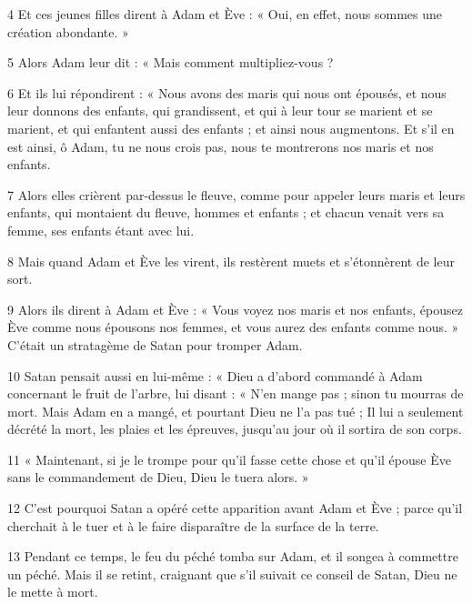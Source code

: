 \par 4 Et ces jeunes filles dirent à Adam et Ève : « Oui, en effet, nous sommes une création abondante. »

\par 5 Alors Adam leur dit : « Mais comment multipliez-vous ?

\par 6 Et ils lui répondirent : « Nous avons des maris qui nous ont épousés, et nous leur donnons des enfants, qui grandissent, et qui à leur tour se marient et se marient, et qui enfantent aussi des enfants ; et ainsi nous augmentons. Et s’il en est ainsi, ô Adam, tu ne nous crois pas, nous te montrerons nos maris et nos enfants.

\par 7 Alors elles crièrent par-dessus le fleuve, comme pour appeler leurs maris et leurs enfants, qui montaient du fleuve, hommes et enfants ; et chacun venait vers sa femme, ses enfants étant avec lui.

\par 8 Mais quand Adam et Ève les virent, ils restèrent muets et s'étonnèrent de leur sort.

\par 9 Alors ils dirent à Adam et Ève : « Vous voyez nos maris et nos enfants, épousez Ève comme nous épousons nos femmes, et vous aurez des enfants comme nous. » C’était un stratagème de Satan pour tromper Adam.

\par 10 Satan pensait aussi en lui-même : « Dieu a d'abord commandé à Adam concernant le fruit de l'arbre, lui disant : « N'en mange pas ; sinon tu mourras de mort. Mais Adam en a mangé, et pourtant Dieu ne l'a pas tué ; Il lui a seulement décrété la mort, les plaies et les épreuves, jusqu'au jour où il sortira de son corps.

\par 11 « Maintenant, si je le trompe pour qu'il fasse cette chose et qu'il épouse Ève sans le commandement de Dieu, Dieu le tuera alors. »

\par 12 C'est pourquoi Satan a opéré cette apparition avant Adam et Ève ; parce qu'il cherchait à le tuer et à le faire disparaître de la surface de la terre.

\par 13 Pendant ce temps, le feu du péché tomba sur Adam, et il songea à commettre un péché. Mais il se retint, craignant que s'il suivait ce conseil de Satan, Dieu ne le mette à mort.

